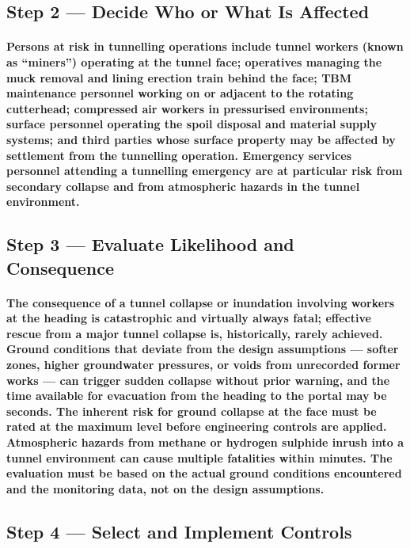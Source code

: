 \subsection{Step 2 --- Decide Who or What Is Affected}
\paragraph{Persons at risk in tunnelling operations include tunnel workers (known as ``miners'') operating at the tunnel face; operatives managing the muck removal and lining erection train behind the face; TBM maintenance personnel working on or adjacent to the rotating cutterhead; compressed air workers in pressurised environments; surface personnel operating the spoil disposal and material supply systems; and third parties whose surface property may be affected by settlement from the tunnelling operation. Emergency services personnel attending a tunnelling emergency are at particular risk from secondary collapse and from atmospheric hazards in the tunnel environment.}

\subsection{Step 3 --- Evaluate Likelihood and Consequence}
\paragraph{The consequence of a tunnel collapse or inundation involving workers at the heading is catastrophic and virtually always fatal; effective rescue from a major tunnel collapse is, historically, rarely achieved. Ground conditions that deviate from the design assumptions --- softer zones, higher groundwater pressures, or voids from unrecorded former works --- can trigger sudden collapse without prior warning, and the time available for evacuation from the heading to the portal may be seconds. The inherent risk for ground collapse at the face must be rated at the maximum level before engineering controls are applied. Atmospheric hazards from methane or hydrogen sulphide inrush into a tunnel environment can cause multiple fatalities within minutes. The evaluation must be based on the actual ground conditions encountered and the monitoring data, not on the design assumptions.}

\subsection{Step 4 --- Select and Implement Controls}
